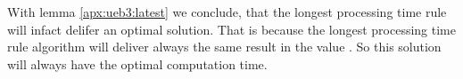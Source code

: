 \documentclass[11pt,a4paper,ngerman]{article}
\begin{document}
\begin{description}
        With lemma \ref{apx:ueb3:latest} we conclude, that the longest processing time rule
        will infact delifer an optimal solution. That is because the longest processing 
        time rule  algorithm will deliver always the same result in the value . 
        So this solution will always have the optimal computation time.
\end{description}

\label{LastPage}
\end{document}
